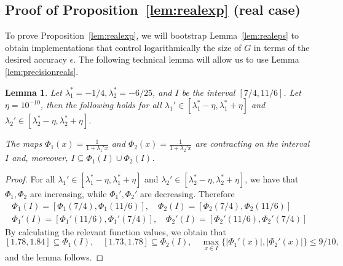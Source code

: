 \documentclass[11pt]{article}
\newtheorem{lemma}[theorem]{Lemma}
\begin{document}
\subsection{Proof of Proposition~\ref{lem:realexp} (real case)}\label{sec:realexp}



To prove Proposition~\ref{lem:realexp}, we will bootstrap Lemma~\ref{lem:realeps} to obtain implementations that control logarithmically the size of $G$ in terms of the desired accuracy $\epsilon$. The following technical lemma will allow us to use Lemma \ref{lem:precisionreals}.
\begin{lemma}\label{lem:numerics}
Let $\lambda_1^*=-1/4, \lambda_2^*=-6/25$, and $I$ be the interval $[7/4,11/6]$. Let $\eta=10^{-10}$, then the following holds for all $\lambda_1'\in [\lambda_1^*-\eta,\lambda_1^*+\eta]$ and $\lambda_2'\in [\lambda_2^*-\eta,\lambda_2^*+\eta]$.

The maps $\Phi_1(x)=\frac{1}{1+\lambda_1'x}$ and $\Phi_2(x)=\frac{1}{1+\lambda_2'x}$ are contracting on the interval $I$ and, moreover, $I\subseteq \Phi_1(I)\cup \Phi_2(I)$.
\end{lemma}
\begin{proof}
For all $\lambda_1'\in [\lambda_1^*-\eta,\lambda_1^*+\eta]$ and $\lambda_2'\in [\lambda_2^*-\eta,\lambda_2^*+\eta]$, we have that $\Phi_1,\Phi_2$ are increasing, while $\Phi_1',\Phi_2'$ are decreasing. Therefore
\begin{gather*}
\Phi_1(I)=[\Phi_1(7/4),\Phi_1(11/6)],\quad  \Phi_2(I)=[\Phi_2(7/4),\Phi_2(11/6)]\\
\Phi_1'(I)=[\Phi_1'(11/6),\Phi_1'(7/4)],\quad  \Phi_2'(I)=[\Phi_2'(11/6),\Phi_2'(7/4)]
\end{gather*}
By calculating the relevant function values, we obtain that
\[[1.78,1.84]\subseteq \Phi_1(I),\quad [1.73,1.78] \subseteq \Phi_2(I), \quad \max_{x\in I}\big\{|\Phi_1'(x)|,|\Phi_2'(x)|\big\}\leq 9/10,\]
and the lemma follows.
\end{proof}
\end{document}
